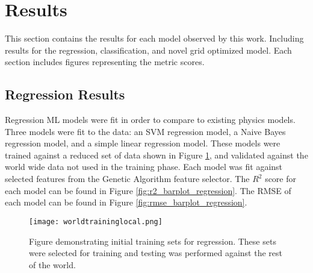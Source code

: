 \section{Results}
\setlength{\parindent}{10ex}

This section contains the results for each model observed by this work.
Including results for the regression, classification, and novel grid optimized model.
Each section includes figures representing the metric scores.

\subsection{Regression Results}
Regression \ac{ML} models were fit in order to compare to existing physics models.
Three models were fit to the data: 
an SVM regression model, a Naive Bayes regression model, and a simple linear regression model.
These models were trained against a reduced set of data shown in Figure \ref{fig:trainset}, and validated against the world wide data not used in the training phase.
Each model was fit against selected features from the Genetic Algorithm feature selector.
The \(R^2\) score for each model can be found in Figure \ref{fig:r2_barplot_regression}.
The RMSE of each model can be found in Figure \ref{fig:rmse_barplot_regression}.



\begin{figure}[htp]
    \centering
    \texttt{[image: worldtraininglocal.png]}
    \caption{Figure demonstrating initial training sets for regression. These sets were selected for training and testing was performed against the rest of the world.}
    \label{fig:trainset}
\end{figure}



